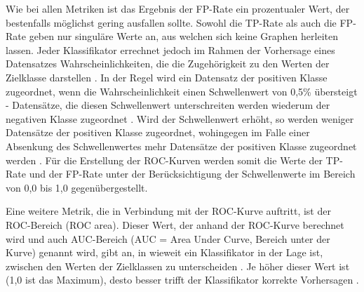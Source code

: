 Wie bei allen Metriken ist das Ergebnis der FP-Rate ein prozentualer Wert, der bestenfalls möglichst gering ausfallen sollte. Sowohl die TP-Rate als auch die FP-Rate geben nur singuläre Werte an, aus welchen sich keine Graphen herleiten lassen. Jeder Klassifikator errechnet jedoch im Rahmen der Vorhersage eines Datensatzes Wahrscheinlichkeiten, die die Zugehörigkeit zu den Werten der Zielklasse darstellen \cite{KNIMETV2019}. In der Regel wird ein Datensatz der positiven Klasse zugeordnet, wenn die Wahrscheinlichkeit einen Schwellenwert von 0,5\% übersteigt - Datensätze, die diesen Schwellenwert unterschreiten werden wiederum der negativen Klasse zugeordnet \cite{KNIMETV2019}. Wird der Schwellenwert erhöht, so werden weniger Datensätze der positiven Klasse zugeordnet, wohingegen im Falle einer Absenkung des Schwellenwertes mehr Datensätze der positiven Klasse zugeordnet werden \cite{KNIMETV2019}. Für die Erstellung der ROC-Kurven werden somit die Werte der TP-Rate und der FP-Rate unter der Berücksichtigung der Schwellenwerte im Bereich von 0,0 bis 1,0 gegenübergestellt.

Eine weitere Metrik, die in Verbindung mit der ROC-Kurve auftritt, ist der ROC-Bereich (ROC area). Dieser Wert, der anhand der ROC-Kurve berechnet wird und auch AUC-Bereich (AUC = Area Under Curve, Bereich unter der Kurve) genannt wird, gibt an, in wieweit ein Klassifikator in der Lage ist, zwischen den Werten der Zielklassen zu unterscheiden \cite{Narkhede2018}. Je höher dieser Wert ist (1,0 ist das Maximum), desto besser trifft der Klassifikator korrekte Vorhersagen \cite{Narkhede2018}.

